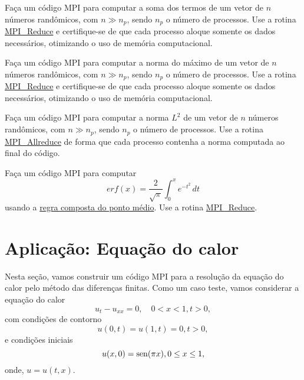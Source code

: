 \begin{exer}
  Faça um código MPI para computar a soma dos termos de um vetor de $n$ números randômicos, com $n\gg n_p$, sendo $n_p$ o número de processos. Use a rotina \href{https://www.open-mpi.org/doc/current/man3/MPI_Reduce.3.php}{MPI\_Reduce} e certifique-se de que cada processo aloque somente os dados necessários, otimizando o uso de memória computacional.
\end{exer}

\begin{exer}
  Faça um código MPI para computar a norma do máximo de um vetor de $n$ números randômicos, com $n\gg n_p$, sendo $n_p$ o número de processos. Use a rotina \href{https://www.open-mpi.org/doc/current/man3/MPI_Reduce.3.php}{MPI\_Reduce} e certifique-se de que cada processo aloque somente os dados necessários, otimizando o uso de memória computacional.
\end{exer}

\begin{exer}
  Faça um código MPI para computar a norma $L^2$ de um vetor de $n$ números randômicos, com $n\gg n_p$, sendo $n_p$ o número de processos. Use a rotina \href{https://www.open-mpi.org/doc/current/man3/MPI_Allreduce.3.php}{MPI\_Allreduce} de forma que cada processo contenha a norma computada ao final do código.
\end{exer}

\begin{exer}
  Faça um código MPI para computar
  \begin{equation}
    erf(x) = \frac{2}{\sqrt{\pi}}\int_0^x e^{-t^2}\,dt
  \end{equation}
  usando a \href{https://phkonzen.github.io/notas/MatematicaNumerica/cap_integr_sec_int_comp.html}{regra composta do ponto médio}. Use a rotina \href{https://www.open-mpi.org/doc/current/man3/MPI_Reduce.3.php}{MPI\_Reduce}.
\end{exer}

\section {Aplicação: Equação do calor}\label{cap_mpi_sec_calor}

Nesta seção, vamos construir um código MPI para a resolução da equação do calor pelo método das diferenças finitas. Como um caso teste, vamos considerar a equação do calor
\begin{equation}\label{eq:mpi_calor_eq}
  u_t - u_{xx} = 0,\quad 0<x<1, t>0,
\end{equation}
com condições de contorno
\begin{equation}\label{eq:mpi_calor_cc}
  u(0,t) = u(1,t) = 0, t>0,
\end{equation}
e condições iniciais
\begin{equation}\label{eq:mpi_calor_ci}
  u(x,0) = \operatorname{sen}(\pi x), 0\leq x\leq 1,
\end{equation}
onde, $u = u(t, x)$.

